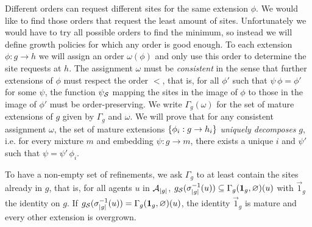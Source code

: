 \documentclass[a4paper,12pt]{article}
\newcommand{\ie}{i.e.\xspace}
\newcommand{\anon}[1]{\left|#1\right|}
\newcommand{\gp}{\Gamma}
\newcommand{\id}{\vec{1}}
\begin{document}
Different orders can request different sites
for the same extension $\phi$.
We would like to find those orders
that request the least amount of sites.
Unfortunately we would have to
try all possible orders to find the minimum,
so instead we will define growth policies
for which any order is good enough.
To each extension $\phi: g \to h$
we will assign an order $\omega(\phi)$
and only use this order to determine the site requests at $h$.
The assignment $\omega$ must be \emph{consistent}
in the sense that further extensions of $\phi$
must respect the order $<$,
that is, for all $\phi'$ such that $\psi\,\phi = \phi'$
for some $\psi$, the function $\psi_{\mathcal{S}}$ mapping the sites
in the image of $\phi$ to those in the image of $\phi'$
must be order-preserving.
We write $\gp_g(\omega)$ for the set of mature extensions of $g$
given by $\gp_g$ and $\omega$.
We will prove that
for any consistent assignment $\omega$, %
the set of mature extensions $\left\{ \phi_i: g \to h_i \right\}$
\emph{uniquely decomposes} $g$,
\ie for every mixture $m$ and embedding $\psi: g \to m$,
there exists a unique $i$ and $\psi'$
such that $\psi = \psi' \, \phi_i$.

To have a non-empty set of refinements,
we ask $\gp_g$ to at least contain the sites already in $g$,
that is, for all agents $u$ in $\agents_{\anon{g}}$,
$g_\sites(\sitemap_{\anon{g}}^{-1}(u)) \subseteq
\gp_g(\id_g, \varnothing)(u)$
with $\id_g$ the identity on $g$.
If $g_\sites(\sitemap_{\anon{g}}^{-1}(u)) =
\gp_g(\id_g, \varnothing)(u)$,
the identity $\id_g$ is mature
and every other extension is overgrown.
\end{document}
